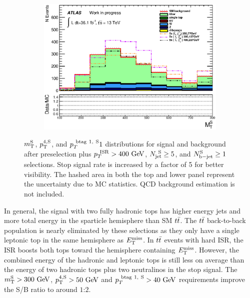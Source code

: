 \begin{figure}[h!]
\begin{center}
\begin{subfigure}[b]{0.40\textwidth}
    	 \includegraphics[width=\textwidth]{figures/plotSR/SR_ND1_MS_3SR.eps}
                \caption{ }
    \end{subfigure}
     \caption[$\MS$, $\pTjV$, and $\pTbV$ distributions for signal and background after preselection plus $\PTISR > 400 \gev$, $\NjV \ge 5$, and $\nBJetS \ge 1$ selections]{ $\MS$, $\pTjV$, and $p_{T}^{~\mathrm{btag~1,~S}}1$ distributions for signal and background after preselection plus $\PTISR > 400 \gev$, $\NjV \ge 5$, and $\nBJetS \ge 1$ selections.  Stop signal rate is increased by a factor of 5 for better visibility. The hashed area in both the top and lower panel represent the uncertainty due to MC statistics.  QCD background estimation is not included.  }
  \label{fig:SR:jetMulti2}
    \end{center}
\end{figure}

\indent In general, the signal with two fully hadronic tops has higher energy jets and more total energy in the sparticle hemisphere than SM $t\bar{t}$.  The $t\bar{t}$ back-to-back  population is nearly eliminated by these selections as they only have a single leptonic top in the same hemisphere as $E_{\mathrm{T}}^{\mathrm{miss}}$.  In $t\bar{t}$ events with hard ISR, the ISR boosts both tops toward the hemisphere containing $E_{\mathrm{T}}^{\mathrm{miss}}$.  However, the combined energy of the hadronic and leptonic tops is still less on average than the energy of two hadronic tops plus two neutralinos in the stop signal.  The $\MS > 300 \gev$, $\pTjV > 50 \gev$ and $\pTbV > 40 \gev$ requirements improve the S/B ratio to around $1$:$2$. \\



